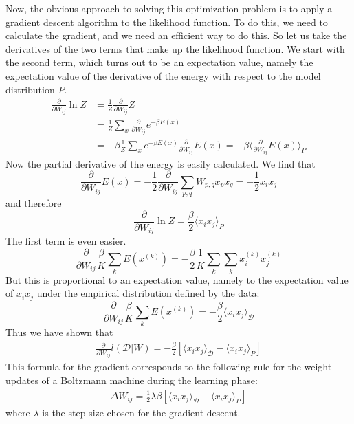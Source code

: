 \documentclass[a4paper, draft]{article}
\theoremstyle{own}
\theoremstyle{remark}
\begin{document}
Now, the obvious approach to solving this optimization problem is to apply a gradient descent algorithm to the likelihood function. To do this, we need to calculate the gradient, and we need an efficient way to do this. So let us take the derivatives of the two terms that make up the likelihood function. We start with the second term, which turns out to be an expectation value, namely the expectation value of the derivative of the energy with respect to the model distribution $P$. 
\begin{align*}
\frac{\partial}{\partial W_{ij}} \ln Z &= 
\frac{1}{Z} \frac{\partial}{\partial W_{ij}} Z \\
&= \frac{1}{Z} \sum_x \frac{\partial}{\partial W_{ij}} e^{-\beta E(x)} \\
&= - \beta \frac{1}{Z} \sum_x e^{-\beta E(x)} \frac{\partial}{\partial W_{ij}} E(x) 
= - \beta \langle \frac{\partial}{\partial W_{ij}} E(x) \rangle_P
\end{align*}
Now the partial derivative of the energy is easily calculated. We find that
$$
\frac{\partial}{\partial W_{ij}} E(x) = 
- \frac{1}{2} \frac{\partial}{\partial W_{ij}}  \sum_{p,q} W_{p,q} x_p x_q = 
- \frac{1}{2} x_i x_j
$$ 
and therefore
$$
\frac{\partial}{\partial W_{ij}} \ln Z = \frac{\beta}{2} \langle x_i x_j \rangle_P
$$
The first term is even easier. 
$$
\frac{\partial}{\partial W_{ij}} \frac{\beta}{K} \sum_k E(x^{(k)}) 
= - \frac{\beta}{2} \frac{1}{K} \sum_k  \sum_k  x_i^{(k)} x_j^{(k)}
$$
But this is proportional to an expectation value, namely to the expectation value of $x_i x_j$ under the empirical distribution defined by the data:
$$
\frac{\partial}{\partial W_{ij}} \frac{\beta}{K} \sum_k E(x^{(k)})  = - \frac{\beta}{2} 
\langle x_i x_j \rangle_{\mathcal D}
$$
Thus we have shown that
\begin{align}\label{eq:boltzmannmachinegradient}
\frac{\partial}{\partial W_{ij}} l({\mathcal D} | W) =
- \frac{\beta}{2}  \left[    \langle x_i x_j \rangle_{\mathcal D} - 
\langle x_i x_j \rangle_P       \right]
\end{align}
This formula for the gradient corresponds to the following rule for the weight updates of a Boltzmann machine during the learning phase:
\begin{align}
\label{eq:boltzmannweightupdates}
\Delta W_{ij} = \frac{1}{2} \lambda \beta \left[    \langle x_i x_j \rangle_{\mathcal D} - 
\langle x_i x_j \rangle_P       \right]
\end{align}
where $\lambda$ is the step size chosen for the gradient descent.
\end{document}
